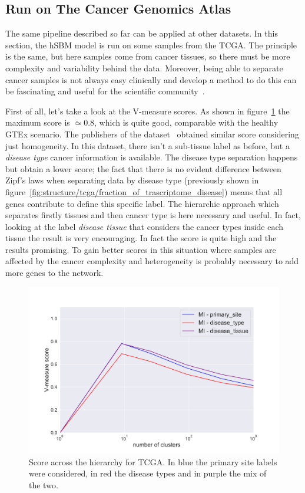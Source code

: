 \subsection{Run on The Cancer Genomics Atlas}
The same pipeline described so far can be applied at other datasets. In this section, the hSBM model is run on some samples from the TCGA. The principle is the same, but here samples come from cancer tissues, so there must be more complexity and variability behind the data. Moreover, being able to separate cancer samples is not always easy clinically and develop a method to do this can be fascinating and useful for the scientific community~\cite{Farver2018}. 

First of all, let's take a look at the V-measure scores. As shown in figure~\ref{fig:topic/tcga/metric} the maximum score is $\simeq 0.8$, which is quite good, comparable with the healthy GTEx scenario. The publishers of the dataset~\cite{Farver2018} obtained similar score considering just homogeneity. In this dataset, there isn't a sub-tissue label as before, but a \textit{disease type} cancer information is available. The disease type separation happens but obtain a lower score; the fact that there is no evident difference between Zipf's laws when separating data by disease type (previously shown in figure~\ref{fig:structure/tcga/fraction_of_trascriptome_disease}) means that all genes contribute to define this specific label. The hierarchic approach which separates firstly tissues and then cancer type is here necessary and useful. In fact, looking at the label \textit{disease tissue} that considers the cancer types inside each tissue the result is very encouraging. In fact the score is quite high and the results promising. To gain better scores in this situation where samples are affected by the cancer complexity and heterogeneity is probably necessary to add more genes to the network. 
\begin{figure}[htb!]
    \centering
    \includegraphics[width=0.85\linewidth]{pictures/topic/tcga/metric.pdf}
    \caption{Score across the hierarchy for TCGA. In blue the primary site labels were considered, in red the disease types and in purple the mix of the two.}
    \label{fig:topic/tcga/metric}
\end{figure}
